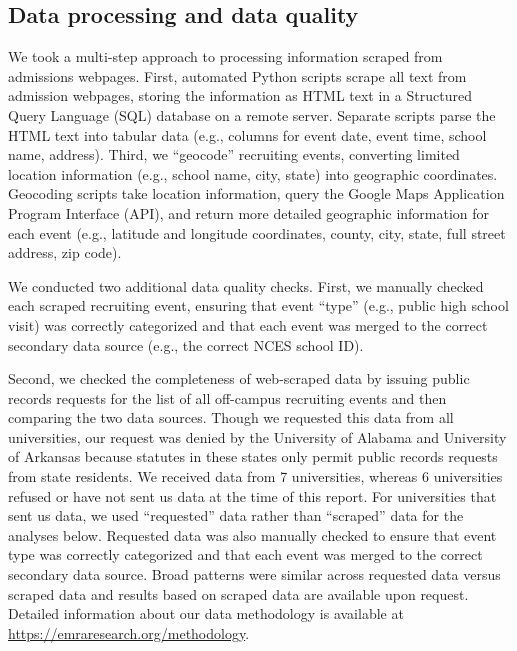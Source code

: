 \documentclass[twoside]{article}
\begin{document}

\subsection*{Data processing and data quality}

We took a multi-step approach to processing information scraped from admissions webpages. First, automated Python scripts scrape all text from admission webpages, storing the information as HTML text in a Structured Query Language (SQL) database on a remote server. Separate scripts parse the HTML text into tabular data (e.g., columns for event date, event time, school name, address). Third, we ``geocode'' recruiting events, converting limited location information (e.g., school name, city, state) into geographic coordinates. Geocoding scripts take location information, query the Google Maps Application Program Interface (API), and return more detailed geographic information for each event (e.g., latitude and longitude coordinates, county, city, state, full street address, zip code).

We conducted two additional data quality checks. First, we manually checked each scraped recruiting event, ensuring that event ``type'' (e.g., public high school visit) was correctly categorized and that each event was merged to the correct secondary data source (e.g., the correct NCES school ID).

Second, we checked the completeness of web-scraped data by issuing public records requests for the list of all off-campus recruiting events and then comparing the two data sources. Though we requested this data from all universities, our request was denied by the University of Alabama and University of Arkansas because statutes in these states only permit public records requests from state residents. We received data from 7 universities, whereas 6 universities refused or have not sent us data at the time of this report. For universities that sent us data, we used ``requested'' data rather than ``scraped'' data for the analyses below. Requested data was also manually checked to ensure that event type was correctly categorized and that each event was merged to the correct secondary data source. Broad patterns were similar across requested data versus scraped data and results based on scraped data are available upon request. Detailed information about our data methodology is available at \href{https://emraresearch.org/methodology}{https://emraresearch.org/methodology}.
\end{document}
